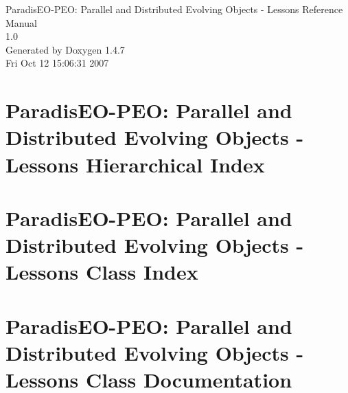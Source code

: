 \documentclass[a4paper]{book}
\begin{document}
\begin{titlepage}
\vspace*{7cm}
\begin{center}
{\Large Paradis\-EO-PEO: Parallel and Distributed Evolving Objects - Lessons Reference Manual\\[1ex]\large 1.0 }\\
\vspace*{1cm}
{\large Generated by Doxygen 1.4.7}\\
\vspace*{0.5cm}
{\small Fri Oct 12 15:06:31 2007}\\
\end{center}
\end{titlepage}
\clearemptydoublepage
{}
\tableofcontents
\clearemptydoublepage
{}
\chapter{Paradis\-EO-PEO: Parallel and Distributed Evolving Objects - Lessons Hierarchical Index}

\chapter{Paradis\-EO-PEO: Parallel and Distributed Evolving Objects - Lessons Class Index}

\chapter{Paradis\-EO-PEO: Parallel and Distributed Evolving Objects - Lessons Class Documentation}














\printindex
\end{document}
